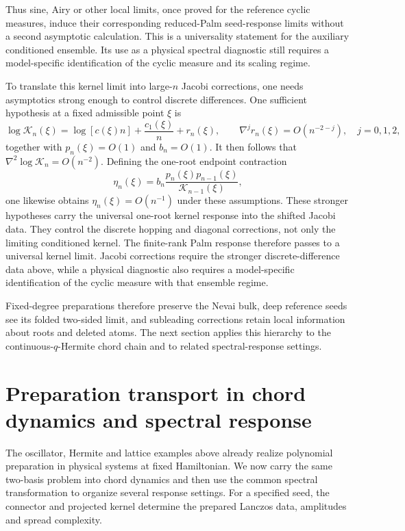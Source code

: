 \documentclass[a4paper,11pt]{article}
\theoremstyle{definition}
\theoremstyle{remark}
\begin{document}
Thus sine, Airy or other local limits, once proved for the reference cyclic measures, induce
their corresponding reduced-Palm seed-response limits without a second asymptotic calculation.
This is a universality statement for the auxiliary conditioned ensemble.  Its use as a physical
spectral diagnostic still requires a model-specific identification of the cyclic measure and its
scaling regime.

To translate this kernel limit into large-$n$ Jacobi corrections, one needs asymptotics strong
enough to control discrete differences. One sufficient hypothesis at a fixed admissible point $\xi$ is
\begin{equation}
   \log\mathcal K_n(\xi)=\log[c(\xi)n]+\frac{c_1(\xi)}{n}+r_n(\xi),
   \qquad
   \nabla^j r_n(\xi)=O(n^{-2-j}),\quad j=0,1,2,
   \label{eq:palm-difference-controlled-hypothesis}
\end{equation}
together with $p_n(\xi)=O(1)$ and $b_n=O(1)$.  It then follows that
$\nabla^2\log\mathcal K_n=O(n^{-2})$.  Defining the one-root endpoint contraction
\begin{equation}
   \eta_n(\xi)=
   b_n\frac{p_n(\xi)p_{n-1}(\xi)}{\mathcal K_{n-1}(\xi)},
   \label{eq:one-root-eta-main}
\end{equation}
one likewise obtains $\eta_n(\xi)=O(n^{-1})$ under these assumptions.
These stronger hypotheses carry the universal one-root kernel response into the shifted
Jacobi data.  They control the discrete hopping and diagonal corrections, not only the limiting
conditioned kernel.
The finite-rank Palm response therefore passes to a universal kernel limit.  Jacobi
corrections require the stronger discrete-difference data above, while a physical diagnostic also
requires a model-specific identification of the cyclic measure with that ensemble regime.

Fixed-degree preparations therefore preserve the Nevai bulk, deep reference seeds see its
folded two-sided limit, and subleading corrections retain local information about roots and
deleted atoms.  The next section applies this hierarchy to the continuous-$q$-Hermite chord chain
and to related spectral-response settings.

\section{%
Preparation transport in chord dynamics and spectral response}
\label{sec:context}

 

The oscillator, Hermite and lattice examples above already realize polynomial preparation
in physical systems at fixed Hamiltonian.  We now carry the same two-basis problem into chord
dynamics and then use the common spectral transformation to organize several response settings.
For a specified seed, the connector and projected kernel determine the prepared Lanczos data,
amplitudes and spread complexity.
\end{document}
